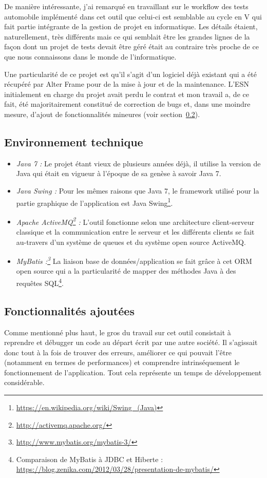 De manière intéressante, j'ai remarqué en travaillant sur le workflow des tests automobile implémenté dans cet outil que celui-ci est semblable au cycle en V qui fait partie intégrante de la gestion de projet en informatique. Les détails étaient, naturellement, très différents mais ce qui semblait être les grandes lignes de la façon dont un projet de tests devait être géré était au contraire très proche de ce que nous connaissons dans le monde de l'informatique.

Une particularité de ce projet est qu'il s'agit d'un logiciel déjà existant qui a été récupéré par Alter Frame pour de la mise à jour et de la maintenance. L'ESN initialement en charge du projet avait perdu le contrat et mon travail a, de ce fait, été majoritairement constitué de correction de bugs et, dans une moindre mesure, d'ajout de fonctionnalités mineures (voir section~\ref{subsec:ajout}).

\subsection{Environnement technique}
\begin{itemize}[label=$\bullet$]
\item \emph{Java 7 :} Le projet étant vieux de plusieurs années déjà, il utilise la version de Java qui était en vigueur à l'époque de sa genèse à savoir Java 7.
\item \emph{Java Swing :} Pour les mêmes raisons que Java 7, le framework utilisé pour la partie graphique de l'application est Java Swing\footnote{\url{https://en.wikipedia.org/wiki/Swing_(Java)}}.
\item \emph{Apache ActiveMQ\footnote{\url{http://activemq.apache.org/}} :} L'outil fonctionne selon une architecture client-serveur classique et la communication entre le serveur et les différents clients se fait au-travers d'un système de queues et du système open source ActiveMQ.
\item \emph{MyBatis :\footnote{\url{http://www.mybatis.org/mybatis-3/}}} La liaison base de données/application se fait grâce à cet ORM open source qui a la particularité de mapper des méthodes Java à des requêtes SQL\footnote{Comparaison de MyBatis à JDBC et Hiberte : \url{https://blog.zenika.com/2012/03/28/presentation-de-mybatis/}}.
\end{itemize}

\subsection{Fonctionnalités ajoutées}
\label{subsec:ajout}
Comme mentionné plus haut, le gros du travail sur cet outil consistait à reprendre et débugger un code au départ écrit par une autre société. Il s'agissait donc tout à la fois de trouver des erreurs, améliorer ce qui pouvait l'être (notamment en termes de performances) et comprendre intrinséquement le fonctionnement de l'application. Tout cela représente un temps de développement considérable.

